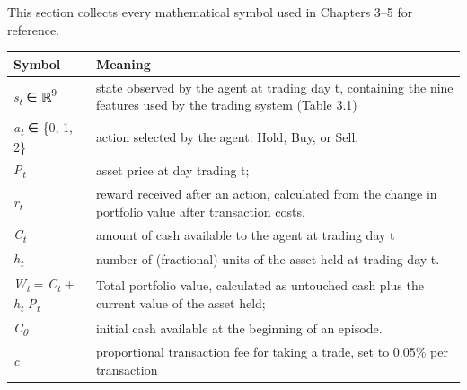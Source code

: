 
This section collects every mathematical symbol used in Chapters 3--5
for reference.

{\small
\renewcommand{\rowsep}{\arrayrulecolor{black!22}\specialrule{0.35pt}{1pt}{1.5pt}\arrayrulecolor{black}}
\def\LTcaptype{none} %
\begin{longtable}[]{@{}
  >{\raggedright\arraybackslash}p{}
  >{\raggedright\arraybackslash}p{}@{}}
\toprule\noalign{}
\begin{minipage}[b]{\linewidth}\raggedright
\textbf{Symbol}
\end{minipage} & \begin{minipage}[b]{\linewidth}\raggedright
\textbf{Meaning}
\end{minipage} \\
\midrule\noalign{}
\endhead
\bottomrule\noalign{}
\endlastfoot
\emph{s\textsubscript{t}} ∈ ℝ\textsuperscript{9} & state observed by the
agent at trading day t, containing the nine features used by the
trading system (Table 3.1) \\
\rowsep
\emph{a\textsubscript{t}} ∈ \{0, 1, 2\} & action selected by the agent:
Hold, Buy, or Sell. \\
\rowsep
\emph{P\textsubscript{t}} & asset price at day trading t; \\
\rowsep
\emph{r\textsubscript{t}} & reward received after an action, calculated
from the change in portfolio value after transaction costs. \\
\rowsep
\emph{C\textsubscript{t}} & amount of cash available to the agent at
trading day t \\
\rowsep
\emph{h\textsubscript{t}} & number of (fractional) units of the asset
held at trading day t. \\
\rowsep
\emph{W\textsubscript{t}} = \emph{C\textsubscript{t}} +
\emph{h\textsubscript{t}} \emph{P\textsubscript{t}} & Total portfolio
value, calculated as untouched cash plus the current value of the asset
held; \\
\rowsep
\emph{C\textsubscript{0}} & initial cash available at the beginning of
an episode. \\
\rowsep
\emph{c} & proportional transaction fee for taking a trade, set to
0.05\% per transaction \\

\end{longtable}}
